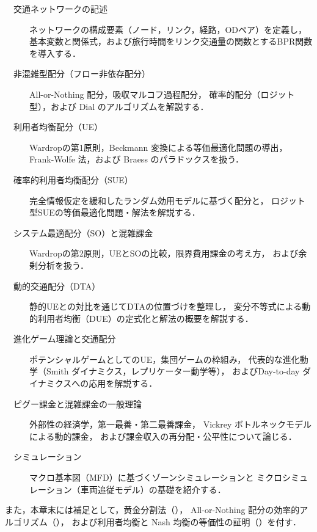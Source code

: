 \begin{description}
  \item[　交通ネットワークの記述]
    ネットワークの構成要素（ノード，リンク，経路，ODペア）を定義し，
    基本変数と関係式，および旅行時間をリンク交通量の関数とするBPR関数を導入する．

  \item[　非混雑型配分（フロー非依存配分）]
    All-or-Nothing 配分，吸収マルコフ過程配分，
    確率的配分（ロジット型），および Dial のアルゴリズムを解説する\cite{Dial1971}．

  \item[　利用者均衡配分（UE）]
    Wardropの第1原則，Beckmann 変換による等価最適化問題の導出，
    Frank-Wolfe 法，および Braess のパラドックスを扱う\cite{Beckmann1956,FrankWolfe1956,Wardrop1952}．

  \item[　確率的利用者均衡配分（SUE）]
    完全情報仮定を緩和したランダム効用モデルに基づく配分と，
    ロジット型SUEの等価最適化問題・解法を解説する\cite{Fisk1980,McFadden1974}．

  \item[　システム最適配分（SO）と混雑課金]
    Wardropの第2原則，UEとSOの比較，限界費用課金の考え方，
    および余剰分析を扱う\cite{Pigou1920}．

  \item[　動的交通配分（DTA）]
    静的UEとの対比を通じてDTAの位置づけを整理し，
    変分不等式による動的利用者均衡（DUE）の定式化と解法の概要を解説する．

  \item[　進化ゲーム理論と交通配分]
    ポテンシャルゲームとしてのUE，集団ゲームの枠組み，
    代表的な進化動学（Smith ダイナミクス，レプリケーター動学等），
    およびDay-to-day ダイナミクスへの応用を解説する\cite{Sandholm2001,Sandholm2010}．

  \item[　ピグー課金と混雑課金の一般理論]
    外部性の経済学，第一最善・第二最善課金，
    Vickrey ボトルネックモデルによる動的課金，
    および課金収入の再分配・公平性について論じる\cite{Vickrey1969}．

  \item[　シミュレーション]
    マクロ基本図（MFD）に基づくゾーンシミュレーションと
    ミクロシミュレーション（車両追従モデル）の基礎を紹介する\cite{Daganzo2007,Geroliminis2008,Gazis1961}．
\end{description}

また，本章末には補足として，黄金分割法（），
All-or-Nothing 配分の効率的アルゴリズム（），
および利用者均衡と Nash 均衡の等価性の証明（）を付す\cite{Nash1950,Nash1951}．
